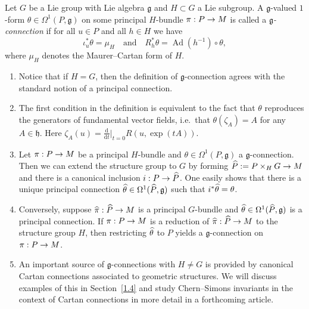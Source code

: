 \documentclass[AHL,Unicode,longabstracts]{cedram}
\newcommand{\x}{\times}
\DeclareMathOperator{\Ad}{Ad}
\renewcommand*{\d}{\mathrm{d}}
\newcommand{\fkg}{\mathfrak{g}}
\newcommand{\fkh}{\mathfrak{h}}
\renewcommand*{\to}{\mathchoice{\longrightarrow}{\rightarrow}{\rightarrow}{\rightarrow}}
\newcommand*{\relabel}{\renewcommand{\labelenumi}{(\theenumi)}}
\newcommand*{\romanenumi}{\renewcommand*{\theenumi}{\roman{enumi}}\relabel}
\let\oldhat\hat
\renewcommand*{\hat}[1]{\mathchoice{\widehat{#1}}{\widehat{#1}}{\oldhat{#1}}{\oldhat{#1}}}
\begin{document}
\begin{defi}\label{defn:gconnection}
Let $G$ be a Lie group with Lie algebra $\fkg$ and $H\subset G$ a Lie subgroup. A $\fkg$-valued $1$-form $\theta \in \Omega^1(P,\fkg)$ on some principal $H$-bundle $\pi : P \to M$ is called a
\emph{$\fkg$-connection} if for all $u\in P$ and all $h \in H$ we have
\begin{equation}\label{eqn:gvalued1form}
\iota_u^*\theta=\mu_H \quad \text{and} \quad R_h^*\theta=\Ad(h^{-1})\circ \theta,
\end{equation}
where $\mu_H$ denotes the Maurer--Cartan form of $H$.
\end{defi}

\begin{rema}
\leavevmode
\begin{enumerate}\romanenumi
\item\label{rema3.2.1} Notice that if $H=G$, then the definition of $\fkg$-connection agrees with the standard notion of a principal connection.

\item\label{rema3.2.2} The first condition in the definition is equivalent to the fact that $\theta$ reproduces the generators of fundamental vector fields, i.e.\ that $\theta(\zeta_A)=A$ for any $A\in\fkh$. Here $\zeta_A(u)=\frac{\d}{\d t}|_{t=0}R(u,\exp(tA))$.

\item\label{rema3.2.3} Let $\pi: P\to M$ be a principal $H$-bundle and $\theta\in\Omega^1(P,\fkg)$ a $\fkg$-connection. Then we can extend the structure group to $G$ by forming $\hat{P}:=P\x_H G\to M$ and there is a canonical inclusion $i: P\to \hat{P}$. One easily shows that there is a unique principal connection $\hat{\theta}\in\Omega^1(\hat{P},\fkg)$ such that $i^*\hat{\theta}=\theta$.

\item\label{rema3.2.4} Conversely, suppose $\hat{\pi} : \hat{P} \to M$ is a principal $G$-bundle and $\hat{\theta} \in \Omega^1(\hat{P},\fkg)$ is a principal connection. If $\pi : P \to M$ is a reduction of $\hat{\pi} : \hat{P} \to M$ to the structure group $H$, then restricting $\hat{\theta}$ to $P$ yields a $\fkg$-connection on $\pi : P \to M$.

\item\label{rema3.2.5} An important source of $\fkg$-connections with $H\neq G$ is provided by canonical Cartan connections associated to geometric structures. We will discuss examples of this in Section~\ref{1.4} and study Chern--Simons invariants in the context of Cartan connections in more detail in a forthcoming article.
\end{enumerate}
\end{rema}
\end{document}
